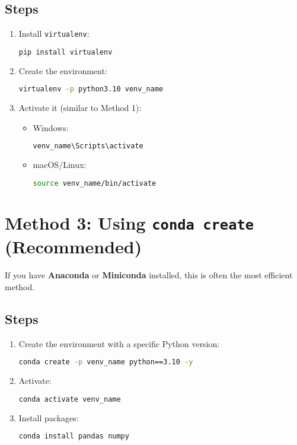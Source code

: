 \subsection*{Steps}
\begin{enumerate}
    \item Install \texttt{virtualenv}:
\begin{lstlisting}[language=bash]
pip install virtualenv
\end{lstlisting}
    \item Create the environment:
\begin{lstlisting}[language=bash]
virtualenv -p python3.10 venv_name
\end{lstlisting}
    \item Activate it (similar to Method 1):
\begin{itemize}
    \item Windows:
\begin{lstlisting}[language=bash]
venv_name\Scripts\activate
\end{lstlisting}
    \item macOS/Linux:
\begin{lstlisting}[language=bash]
source venv_name/bin/activate
\end{lstlisting}
\end{itemize}
\end{enumerate}

\section{Method 3: Using \texttt{conda create} (Recommended)}
If you have \textbf{Anaconda} or \textbf{Miniconda} installed, this is often the most efficient method.

\subsection*{Steps}
\begin{enumerate}
    \item Create the environment with a specific Python version:
\begin{lstlisting}[language=bash]
conda create -p venv_name python==3.10 -y
\end{lstlisting}
    \item Activate:
\begin{lstlisting}[language=bash]
conda activate venv_name
\end{lstlisting}
    \item Install packages:
\begin{lstlisting}[language=bash]
conda install pandas numpy
\end{lstlisting}
\end{enumerate}

